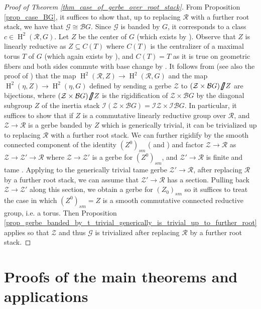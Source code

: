\documentclass{amsart}
\theoremstyle{definition}
\newcommand{\thickslash}{\mathbin{\!\!\pmb{\fatslash}}}
\newcommand{\cG}{\mathcal{G}}
\newcommand{\cZ}{\mathcal{Z}}
\newcommand{\cB}{\mathcal{B}}
\newcommand{\oH}{\operatorname{H}}
\newcommand{\cI}{\mathcal{I}}
\newcommand{\cR}{\mathcal{R}}
\begin{document}
\begin{proof}[Proof of Theorem \ref{thm_case_of_gerbe_over_root_stack}]
From Proposition \ref{prop_case_BG}, it suffices to show that, up to replacing $\cR$ with a further root stack, we have that $\cG \cong \cB G$. Since $\cG$ is banded by $G$, it corresponds to a class $c\in \oH^2(\cR,G)$. Let $Z$ be the center of $G$ (which exists by \cite[Lemma 2.2.4]{ConradReductive}). Observe that $Z$ is linearly reductive as $Z\subseteq C(T)$ where $C(T)$ is the centralizer of a maximal torus $T$ of $G$ (which again exists by \cite[Lemma 2.2.4]{ConradReductive}), and $C(T)=T$ as it is true on geometric fibers and both sides commute with base change by \cite[Theorem 3.3.4]{ConradReductive}. It follows from \cite[Thm. IV.3.3.3]{giraud} (see also the proof of \cite[Proposition 2.1]{bejleri2024proper}) that the map $\oH^2(\cR,Z)\to \oH^2(\cR,G)$ and the map $\oH^2(\eta,Z)\to \oH^2(\eta,G)$ defined by sending a gerbe $\cZ$ to $(\cZ\times \cB G)\thickslash Z$ are bijections, where $(\cZ\times \cB G)\thickslash Z$ is the rigidification of $\cZ\times \cB G$ by the diagonal subgroup $Z$ of the inertia stack $\cI (\cZ \times \cB G) = \cI \cZ \times \cI \cB G$.
In particular, it suffices to show that if $Z$ is a commutative linearly reductive group over $\cR$, and $\cZ\to \cR$ is a gerbe banded by $Z$ which is generically trivial, it can be trivialized up to replacing $\cR$ with a further root stack.
We can further rigidify by the smooth connected component of the identity $(Z^0)_{sm}$ (\cite[Theorem 9.9]{AHRetalelocal} and \cite[Remark 2.2]{bejleri2024proper}) and factor $\cZ\to \cR$ as $\cZ\to \cZ'\to \cR$ where $\cZ\to \cZ'$ is a gerbe for $(Z^0)_{sm}$, and $\cZ'\to \cR$ is finite and tame \cite[Proposition 2.3]{bejleri2024proper}. Applying \cite{bresciani2024arithmetic} to the generically trivial tame gerbe $\cZ'\to \cR$, after replacing $\cR$ by a further root stack, we can assume that $\cZ' \to \cR$ has a section. Pulling back $\cZ \to \cZ'$ along this section, we obtain a gerbe for $(Z_0)_{sm}$ so it suffices to treat the case in which $(Z^0)_{sm} = Z$ is a smooth commutative connected reductive group, i.e. a torus. Then Proposition \ref{prop_gerbe_banded_by_t_trivial_generically_is_trivial_up_to_further_root} applies so that $\cZ$ and thus $\cG$ is trivialized after replacing $\cR$ by a further root stack. 
 \end{proof}

\section{Proofs of the main theorems and applications}
\end{document}
